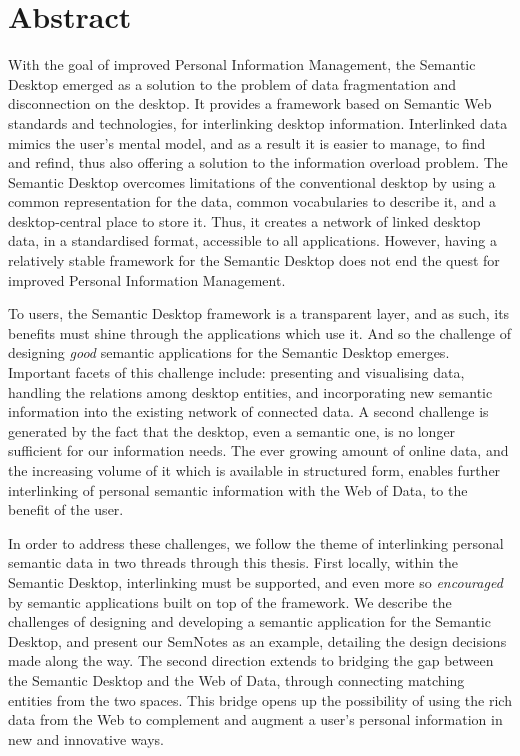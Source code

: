 \section*{Abstract}

With the goal of improved Personal Information Management, the Semantic Desktop emerged as a solution to the problem of data fragmentation and disconnection on the desktop. It provides a framework based on Semantic Web standards and technologies, for interlinking desktop information. Interlinked data mimics the user's mental model, and as a result it is easier to manage, to find and refind, thus also offering a solution to the information overload problem. The Semantic Desktop overcomes limitations of the conventional desktop by using a common representation for the data, common vocabularies to describe it, and a desktop-central place to store it. Thus, it creates a network of linked desktop data, in a standardised format, accessible to all applications. 
However, having a relatively stable framework for the Semantic Desktop does not end the quest for improved Personal Information Management. 

To users, the Semantic Desktop framework is a transparent layer, and as such, its benefits must shine through the applications which use it. And so the challenge of designing \emph{good} semantic applications for the Semantic Desktop emerges. Important facets of this challenge include: presenting and visualising data, handling the relations among desktop entities, and incorporating new semantic information into the existing network of connected data. 
A second challenge is generated by the fact that the desktop, even a semantic one, is no longer sufficient for our information needs. The ever growing amount of online data, and the increasing volume of it which is available in structured form, enables further interlinking of personal semantic information with the Web of Data, to the benefit of the user.

In order to address these challenges, we follow the theme of interlinking personal semantic data in two threads through this thesis. First locally, within the Semantic Desktop, interlinking must be supported, and even more so \emph{encouraged} by semantic applications built on top of the framework. We describe the challenges of designing and developing a semantic application for the Semantic Desktop, and present our SemNotes as an example, detailing the design decisions made along the way. The second direction extends to bridging the gap between the Semantic Desktop and the Web of Data, through connecting matching entities from the two spaces. This bridge opens up the possibility of using the rich data from the Web to complement and augment a user's personal information in new and innovative ways. 